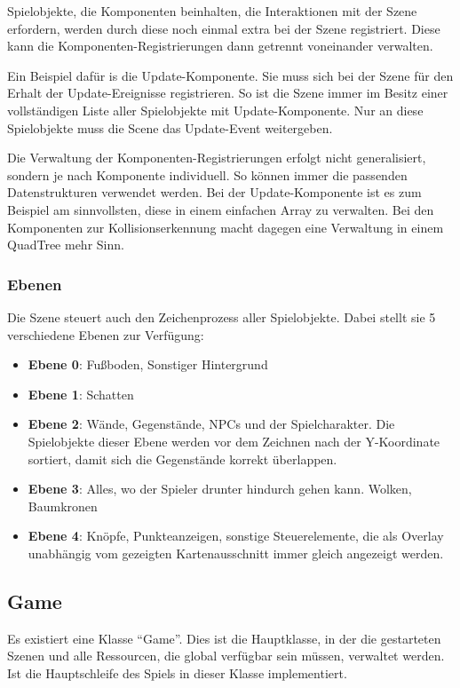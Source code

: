 		Spielobjekte, die Komponenten beinhalten, die Interaktionen mit der Szene erfordern, werden durch diese noch einmal extra bei der Szene registriert. Diese kann die Komponenten-Registrierungen dann getrennt voneinander verwalten.
		
		Ein Beispiel dafür is die Update-Komponente. Sie muss sich bei der Szene für den Erhalt der Update-Ereignisse registrieren. So ist die Szene immer im Besitz einer vollständigen Liste aller Spielobjekte mit Update-Komponente. Nur an diese Spielobjekte muss die Scene das Update-Event weitergeben.

		Die Verwaltung der Komponenten-Registrierungen erfolgt nicht generalisiert, sondern je nach Komponente individuell. So können immer die passenden Datenstrukturen verwendet werden. Bei der Update-Komponente ist es zum Beispiel am sinnvollsten, diese in einem einfachen Array zu verwalten. Bei den Komponenten zur Kollisionserkennung macht dagegen eine Verwaltung in einem QuadTree mehr Sinn.

		\subsubsection{Ebenen}

		Die Szene steuert auch den Zeichenprozess aller Spielobjekte. Dabei stellt sie 5 verschiedene Ebenen zur Verfügung:

		\begin{itemize}
			\item \textbf{Ebene 0}: Fußboden, Sonstiger Hintergrund
			\item \textbf{Ebene 1}: Schatten
			\item \textbf{Ebene 2}: Wände, Gegenstände, NPCs und der Spielcharakter. Die Spielobjekte dieser Ebene werden vor dem Zeichnen nach der Y-Koordinate sortiert, damit sich die Gegenstände korrekt überlappen.
			\item \textbf{Ebene 3}: Alles, wo der Spieler drunter hindurch gehen kann. Wolken, Baumkronen
			\item \textbf{Ebene 4}: Knöpfe, Punkteanzeigen, sonstige Steuerelemente, die als Overlay unabhängig vom gezeigten Kartenausschnitt immer gleich angezeigt werden.
		\end{itemize}

	\subsection{Game}
		Es existiert eine Klasse \enquote{Game}. Dies ist die Hauptklasse, in der die gestarteten Szenen und alle Ressourcen, die global verfügbar sein müssen, verwaltet werden. Ist die Hauptschleife des Spiels in dieser Klasse implementiert.

